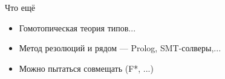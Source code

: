 \documentclass[aspectratio=169]{beamer}
\newtheorem{dfn}{Определение}[section]
\newtheorem{exm}{Пример}[section]
\begin{document}
\begin{comment}
\begin{frame}{Гомотопическая теория типов}
\begin{dfn}Изоморфизм Карри-Ховарда-Воеводского.

\begin{tabular}{lll}
Логика & $\lambda$-исчисление & Топология\\\hline
Утверждение & Тип & Пространство \\
Доказательство & Значение & Точка в пространстве\\
Предикат $(=)$ & Зависимый тип $(=)$ & Путь между точками
\end{tabular}\end{dfn}

\begin{enumerate}
\item Точный смысл равенства.
\item Позволяет легко формулировать утверждения про топологию, гомологическую алгебру и т.п.
\item Можно реализовать (кубическая теория типов). Реализации для Агды, Кока, ..., отдельные языки (Аренд)
\end{enumerate}
\end{frame}

\begin{frame}{Какие вопросы пытаемся решать?}
\begin{exm}Самое простое: $x=y$. Почему $x^2 = y^2$?\end{exm} \pause

А что если так $(a = b) = \{ \langle a,b \rangle | a < 10 \with b < 10 \}$?
Тогда $5=7$, но $25 \ne 49$. \pause

Постулируется в формальной арифметике: $(A2)\ a = b \rightarrow a' = b'$ \pause

\begin{proof}Путь $x$ в $y$ --- функция $f: [0,1] \rightarrow S$, 
$f(0)=x$, $f(1)=y$. $f(x) = x^2$ --- непрерывная функция. Тогда $f(x^2)$ --- тоже непрерывная,
то есть $x^2 = y^2$.\end{proof}
\end{frame}
\end{comment}

\begin{frame}{Что ещё}
\begin{itemize}
\item Гомотопическая теория типов...
\item Метод резолюций и рядом --- Prolog, SMT-солверы,...
\item Можно пытаться совмещать (F*, ...)
\end{itemize}
\end{frame}
\end{document}
